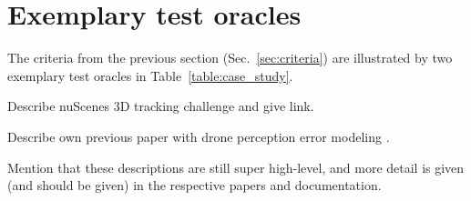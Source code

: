\documentclass[conference]{IEEEtran}
\begin{document}
\section{Exemplary test oracles}
\label{sec:case_studies}


The criteria from the previous section (Sec.~\ref{sec:criteria}) are illustrated by two exemplary test oracles in Table~\ref{table:case_study}.


Describe nuScenes 3D tracking challenge and give link. 

Describe own previous paper with drone perception error modeling \cite{Krajewski2020UsingDrones}. 

Mention that these descriptions are still super high-level, and more detail is given (and should be given) in the respective papers and documentation.



\newcommand{\basicDroneFoV}{ReS FoV is rectangular (about \SI{85}{\meter} $\times$ \SI{45}{\meter}), whereas OuT FoV is \SI{145}{\degree} wide and $\approx$\,\SI{80}{\meter} long. 
The FoVs overlap in the analyzed area.}
\newcommand{\basicDroneOcclusion}{Not published (how did Fabian do it?)}
\newcommand{\basicDroneReSHW}{Camera-equipped drone with 4K resolution hovering in a steady state disturbed by wind.}
\newcommand{\basicDroneReSLabling}{Same as in inD dataset; high-level description of entirely offline post-processing: correcting lens distortion, stabilizing wind disturbances, semantic segmentation by UNet, vehicle localization, then tracking and smoothing by Kalman Filter.}
\newcommand{\basicDroneAreas}{Analyzed area: roads up to non-specified distances from the intersection center. Roads beyond, sidewalks, and anything else is excluded.}
\newcommand{\basicDroneGeometrAlign}{Polynomial transformation of 3\textsuperscript{rd} order from ReS coordinates to OuT coordinates. Polynomial is fitted through corresponding pixels in an orthophoto and a stabilized drone image. 
Accuracy loss in the order of magnitude of $\approx$\,\SI{0.1}{\meter} is not further calculated.}
\newcommand{\basicDroneObjDistance}{Centroid distance over the 2D ground}
\newcommand{\basicDroneMultiObjMatching}{Only car-car matching}
\end{document}
